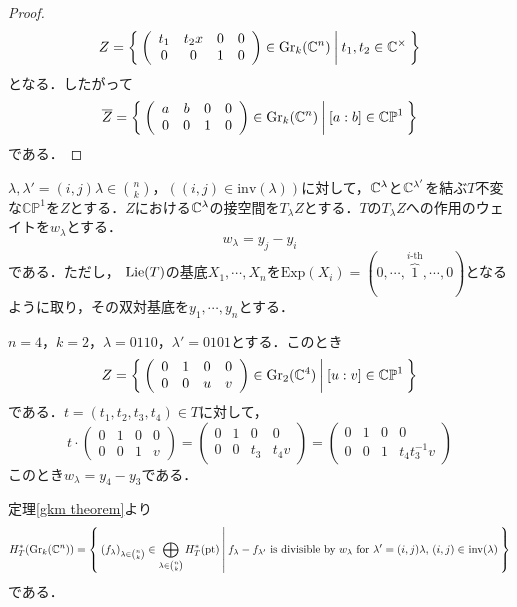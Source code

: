 \begin{proof}
  \[
  Z=\left\{\:\left(\begin{array}{cccc}
    t_1 & t_2x & 0 & 0 \\
    0 & 0 & 1 & 0 
  \end{array}\right)\in\text{Gr}_k(\mathbb{C}^n)\:\middle|\:t_1,t_2\in\mathbb{C}^\times\:\right\}
  \]
  となる．したがって
  \[
  \overline{Z} = \left\{\:\left(\begin{array}{cccc}
    a & b & 0 & 0 \\
    0 & 0 & 1 & 0
  \end{array}\right)\in\text{Gr}_k(\mathbb{C}^n)\:\middle|\:[a:b]\in\mathbb{CP}^1\:\right\}
  \]
  である．
\end{proof}

$\lambda,\lambda'=(i,j)\lambda\in\binom{n}{k}$，$((i,j)\in\text{inv}(\lambda))$に対して，$\mathbb{C}^\lambda$と$\mathbb{C}^{\lambda'}$を結ぶ$T$不変な$\mathbb{CP}^1$を$Z$とする．$Z$における$\mathbb{C}^\lambda$の接空間を$T_\lambda Z$とする．$T$の$T_\lambda Z$への作用のウェイトを$w_\lambda$とする．
\[
w_\lambda = y_j-y_i
\]
である．ただし，  $\text{Lie} (T)$の基底$X_1,\cdots,X_n$を$\text{Exp}(X_i)=(0,\cdots,\overbrace{1}^{i\text{-th}},\cdots,0)$となるように取り，その双対基底を$y_1,\cdots,y_n$とする．

\begin{eg}
  $n=4$，$k=2$，$\lambda=0110$，$\lambda'=0101$とする．このとき
  \[
  Z=\left\{\:
    \left(\begin{array}{cccc}
      0 & 1 & 0 & 0\\
      0 & 0 & u & v
    \end{array}\right)\in\text{Gr}_2(\mathbb{C}^4)
  \:\middle|\:[u:v]\in\mathbb{CP}^1\:\right\}
  \]
  である．$t=(t_1,t_2,t_3,t_4)\in T$に対して，
  \[
  t\cdot\left(\begin{array}{cccc}
    0 & 1 & 0 & 0\\
    0 & 0 & 1 & v
  \end{array}\right)=\left(\begin{array}{cccc}
    0 & 1 & 0 & 0\\
    0 & 0 & t_3 & t_4v
  \end{array}\right)=\left(\begin{array}{cccc}
    0 & 1 & 0 & 0\\
    0 & 0 & 1 & t_4t_3^{-1}v
  \end{array}\right)
  \]
  このとき$w_\lambda=y_4-y_3$である．
\end{eg}


定理\ref{gkm theorem}より
\[
H^*_T(\text{Gr}_k(\mathbb{C}^n))=\left\{\:(f_\lambda)_{\lambda\in\binom{n}{k}}\in\bigoplus_{\lambda\in\binom{n}{k}}H^*_T(\text{pt})\:\middle|\:f_\lambda-f_{\lambda'}\text{ is divisible by $w_\lambda$ for $\lambda' = (i,j)\lambda$, $(i,j)\in$ inv$(\lambda)$}\:\right\}
\]
である．

